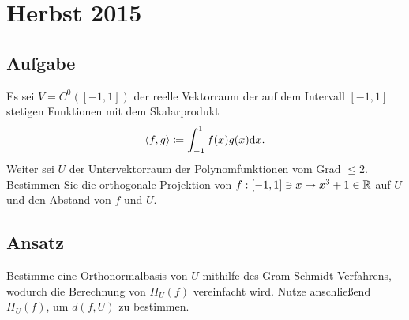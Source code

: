 \section{Herbst 2015}

\subsection{Aufgabe}
Es sei \( V = C^0([-1,1]) \) der reelle Vektorraum der auf dem Intervall \( [-1,1] \) stetigen Funktionen mit dem Skalarprodukt
\begin{equation*}
	\langle f,g \rangle \coloneqq \int_{-1}^1f(x)g(x)\text{d}x\text{.}
\end{equation*}
Weiter sei \( U \) der Untervektorraum der Polynomfunktionen vom Grad \( \leq 2 \). Bestimmen Sie die orthogonale Projektion von \( f:[-1,1] \ni x \mapsto x^3+1 \in \mathbb{R} \) auf \( U \) und den Abstand von \( f \) und \( U \).

\subsection{Ansatz}
Bestimme eine Orthonormalbasis von \( U \) mithilfe des Gram-Schmidt-Verfahrens, wodurch die Berechnung von \( \Pi_U(f) \) vereinfacht wird. Nutze anschließend \( \Pi_U(f) \), um \( d(f,U) \) zu bestimmen.

